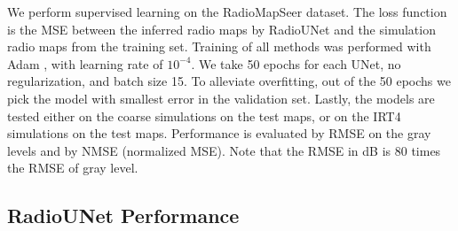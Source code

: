 \documentclass[10pt,a4paper]{article}
\begin{document}
We perform supervised learning on the RadioMapSeer dataset.
The loss function is the MSE between the inferred radio maps by RadioUNet and the simulation radio maps from the training set. Training of all methods was performed with Adam \cite{Adam}, with learning rate of $10^{-4}$. We take 50 epochs for each UNet, no regularization, and batch size 15. To alleviate overfitting, out of the 50 epochs we pick the model with smallest error in the validation set. Lastly, the models are tested either on the coarse simulations on the test maps, or on the IRT4 simulations on the test maps. Performance is evaluated by RMSE on the gray levels and by NMSE (normalized MSE). Note that the RMSE in dB is 80 times the RMSE of gray level.




\subsection{RadioUNet Performance}


\end{document}
